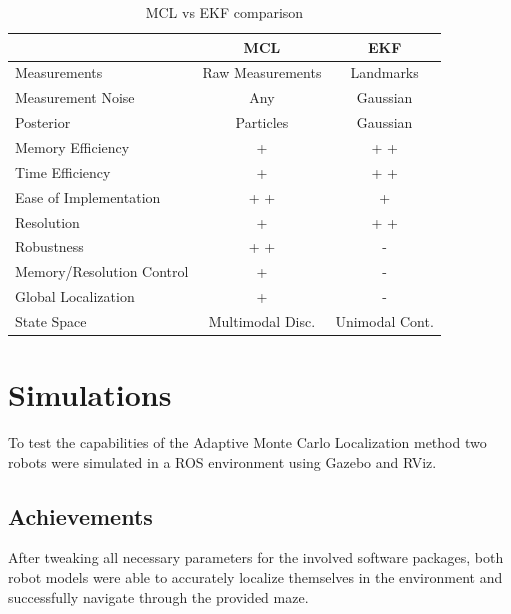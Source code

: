 \documentclass[10pt,journal,compsoc]{IEEEtran}
\begin{document}
\begin{table}[h]
      \caption{MCL vs EKF comparison}
      \label{tab:mcl_ekf_comparison}
      \begin{center}
            \begin{tabular}{|l||c|c|}
                  \hline
                  & MCL & EKF\\ \hline \hline
                  Measurements & Raw Measurements & Landmarks \\ \hline
                  Measurement Noise &  Any &  Gaussian \\ \hline
                  Posterior &  Particles & Gaussian \\ \hline
                  Memory Efficiency & +  & + +  \\ \hline
                  Time Efficiency&  +  & + +  \\ \hline
                  Ease of Implementation & + +  & +  \\ \hline
                  Resolution & +  & + + \\ \hline
                  Robustness & + +  & - \\ \hline
                  Memory/Resolution Control & +  & - \\ \hline
                  Global Localization & +  & - \\ \hline
                  State Space &  Multimodal Disc. & Unimodal Cont. \\ \hline
            \end{tabular}
      \end{center}
\end{table}

\section{Simulations}




To test the capabilities of the Adaptive Monte Carlo Localization method two robots were simulated in a ROS environment using Gazebo and RViz.

\subsection{Achievements}
After tweaking all necessary parameters for the involved software packages, both robot models were able to accurately localize themselves in the environment and successfully navigate through the provided maze.
\end{document}
